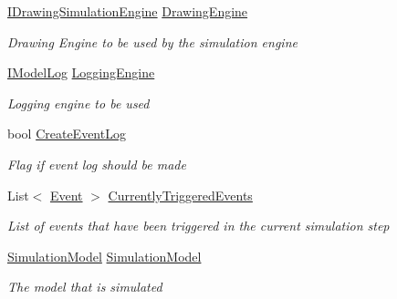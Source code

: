 \begin{DoxyCompactItemize}
\item 
\hyperlink{interface_simulation_core_1_1_interfaces_1_1_i_drawing_simulation_engine}{I\+Drawing\+Simulation\+Engine} \hyperlink{class_simulation_core_1_1_simulation_classes_1_1_simulation_engine_a005278c481e393bfffff3214c5d563d2}{Drawing\+Engine}
\begin{DoxyCompactList}\small\item\em Drawing Engine to be used by the simulation engine \end{DoxyCompactList}\item 
\hyperlink{interface_simulation_core_1_1_interfaces_1_1_i_model_log}{I\+Model\+Log} \hyperlink{class_simulation_core_1_1_simulation_classes_1_1_simulation_engine_aa9344017a15ad179186a73305404c063}{Logging\+Engine}
\begin{DoxyCompactList}\small\item\em Logging engine to be used \end{DoxyCompactList}\item 
bool \hyperlink{class_simulation_core_1_1_simulation_classes_1_1_simulation_engine_a332221c578adb68a541d03f20ffe9b44}{Create\+Event\+Log}
\begin{DoxyCompactList}\small\item\em Flag if event log should be made \end{DoxyCompactList}\item 
List$<$ \hyperlink{class_simulation_core_1_1_h_c_c_m_elements_1_1_event}{Event} $>$ \hyperlink{class_simulation_core_1_1_simulation_classes_1_1_simulation_engine_ab47538ac861f1173cb50f5546d3d7d52}{Currently\+Triggered\+Events}
\begin{DoxyCompactList}\small\item\em List of events that have been triggered in the current simulation step \end{DoxyCompactList}\item 
\hyperlink{class_simulation_core_1_1_simulation_classes_1_1_simulation_model}{Simulation\+Model} \hyperlink{class_simulation_core_1_1_simulation_classes_1_1_simulation_engine_a9937fb2a8987f08182fe9019dd197f90}{Simulation\+Model}
\begin{DoxyCompactList}\small\item\em The model that is simulated \end{DoxyCompactList}\end{DoxyCompactItemize}


